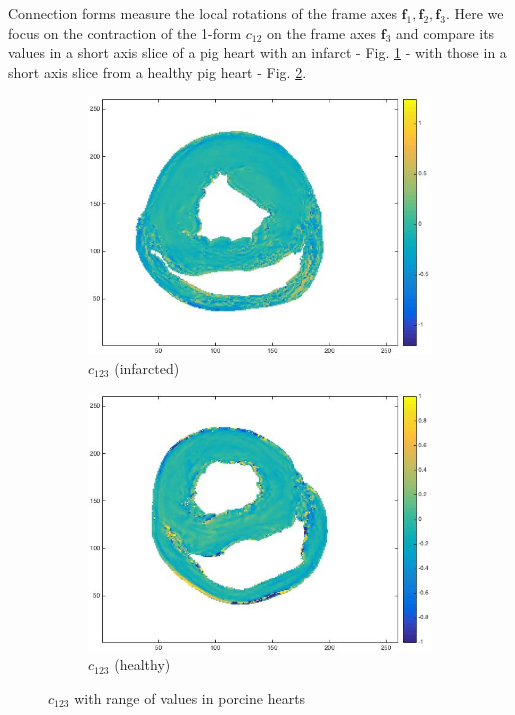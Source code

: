 Connection forms measure the local rotations of the frame axes $\mathbf{f}_1, \mathbf{f}_2, \mathbf{f}_3$. Here we focus on the contraction of the 1-form $c_{12}$ on the frame axes $\mathbf{f}_3$ and compare its values in a short axis slice of a pig heart with an infarct - Fig. \ref{fig:c123infarcted} - with those in a short axis slice from a healthy pig heart - Fig. \ref{fig:c123healthy}.
\begin{figure}[h!]
    \centering
    \begin{subfigure}[h!]{0.48\textwidth}
        \centering
        \includegraphics[width=\textwidth]{figures/pig4_c123_slice_19}
        \caption{$c_{123}$ (infarcted)}
        \label{fig:c123infarcted}
    \end{subfigure}
    \hfill
    \begin{subfigure}[h!]{0.48\textwidth}
        \centering
        \includegraphics[width=\textwidth]{figures/pig25_c123_slice_30}
        \caption{$c_{123}$ (healthy)}
        \label{fig:c123healthy}
    \end{subfigure}
    \caption{$c_{123}$ with range of values in porcine hearts}
    \label{fig:c123all}
\end{figure}


